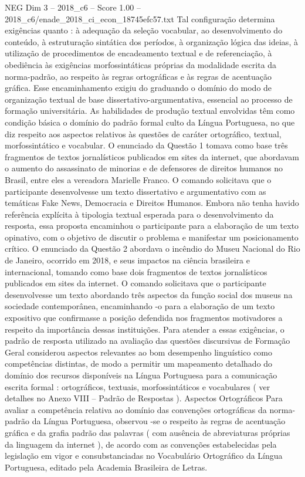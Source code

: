 \begin{textsample}{NEG Dim 3 – 2018\_c6 – Score 1.00 – 2018\_c6/enade\_2018\_ci\_econ\_18745efc57.txt}
Tal configuração determina exigências quanto : à adequação da seleção vocabular, ao desenvolvimento do conteúdo, à estruturação sintática dos períodos, à organização lógica das ideias, à utilização de procedimentos de encadeamento textual e de referenciação, à obediência às exigências morfossintáticas próprias da modalidade escrita da norma-padrão, ao respeito às regras ortográficas e às regras de acentuação gráfica.
Esse encaminhamento exigiu do graduando o domínio do modo de organização textual de base dissertativo-argumentativa, essencial ao processo de formação universitária.
As habilidades de produção textual envolvidas têm como condição básica o domínio do padrão formal culto da Língua Portuguesa, no que diz respeito aos aspectos relativos às questões de caráter ortográfico, textual, morfossintático e vocabular.
O enunciado da Questão 1 tomava como base três fragmentos de textos jornalísticos publicados em sites da internet, que abordavam o aumento do assassinato de minorias e de defensores de direitos humanos no Brasil, entre eles a vereadora Marielle Franco.
O comando solicitava que o participante desenvolvesse um texto dissertativo e argumentativo com as temáticas Fake News, Democracia e Direitos Humanos.
Embora não tenha havido referência explícita à tipologia textual esperada para o desenvolvimento da resposta, essa proposta encaminhou o participante para a elaboração de um texto opinativo, com o objetivo de discutir o problema e manifestar um posicionamento crítico.
O enunciado da Questão 2 abordava o incêndio do Museu Nacional do Rio de Janeiro, ocorrido em 2018, e seus impactos na ciência brasileira e internacional, tomando como base dois fragmentos de textos jornalísticos publicados em sites da internet.
O comando solicitava que o participante desenvolvesse um texto abordando três aspectos da função social dos museus na sociedade contemporânea, encaminhando -o para a elaboração de um texto expositivo que confirmasse a posição defendida nos fragmentos motivadores a respeito da importância dessas instituições.
Para atender a essas exigências, o padrão de resposta utilizado na avaliação das questões discursivas de Formação Geral considerou aspectos relevantes ao bom desempenho linguístico como competências distintas, de modo a permitir um mapeamento detalhado do domínio dos recursos disponíveis na Língua Portuguesa para a comunicação escrita formal : ortográficos, textuais, morfossintáticos e vocabulares ( ver detalhes no Anexo VIII – Padrão de Respostas ).
Aspectos Ortográficos Para avaliar a competência relativa ao domínio das convenções ortográficas da norma-padrão da Língua Portuguesa, observou -se o respeito às regras de acentuação gráfica e da grafia padrão das palavras ( com ausência de abreviaturas próprias da linguagem da internet ), de acordo com as convenções estabelecidas pela legislação em vigor e consubstanciadas no Vocabulário Ortográfico da Língua Portuguesa, editado pela Academia Brasileira de Letras.

\end{textsample}
